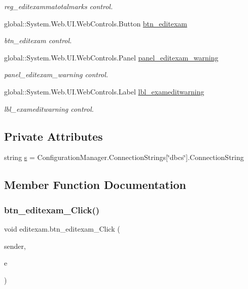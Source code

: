 \begin{DoxyCompactItemize}
\begin{DoxyCompactList}\small\item\em reg\+\_\+editexammatotalmarks control. \end{DoxyCompactList}\item 
global\+::\+System.\+Web.\+U\+I.\+Web\+Controls.\+Button \mbox{\hyperlink{classeditexam_af43bf725760dc02599a8b089fac04cdd}{btn\+\_\+editexam}}
\begin{DoxyCompactList}\small\item\em btn\+\_\+editexam control. \end{DoxyCompactList}\item 
global\+::\+System.\+Web.\+U\+I.\+Web\+Controls.\+Panel \mbox{\hyperlink{classeditexam_acbbd8953cf1b4270c2074df7c1fce982}{panel\+\_\+editexam\+\_\+warning}}
\begin{DoxyCompactList}\small\item\em panel\+\_\+editexam\+\_\+warning control. \end{DoxyCompactList}\item 
global\+::\+System.\+Web.\+U\+I.\+Web\+Controls.\+Label \mbox{\hyperlink{classeditexam_a2909fb43ac6cb90300b2ebee5f9c20e4}{lbl\+\_\+exameditwarning}}
\begin{DoxyCompactList}\small\item\em lbl\+\_\+exameditwarning control. \end{DoxyCompactList}\end{DoxyCompactItemize}
\subsection*{Private Attributes}
\begin{DoxyCompactItemize}
\item 
string \mbox{\hyperlink{classeditexam_a9e1dff99910d4ac210d1536b1351e432}{s}} = Configuration\+Manager.\+Connection\+Strings\mbox{[}\char`\"{}dbcs\char`\"{}\mbox{]}.Connection\+String
\end{DoxyCompactItemize}


\subsection{Member Function Documentation}
\mbox{\label{classeditexam_a8f00c0059191a10ad60dc7ad3f51eb71}} 
\subsubsection{\texorpdfstring{btn\_editexam\_Click()}{btn\_editexam\_Click()}}
{\footnotesize\ttfamily void editexam.\+btn\+\_\+editexam\+\_\+\+Click (\begin{DoxyParamCaption}\item[{object}]{sender,  }\item[{Event\+Args}]{e }\end{DoxyParamCaption})\hspace{0.3cm}{\ttfamily [protected]}}

